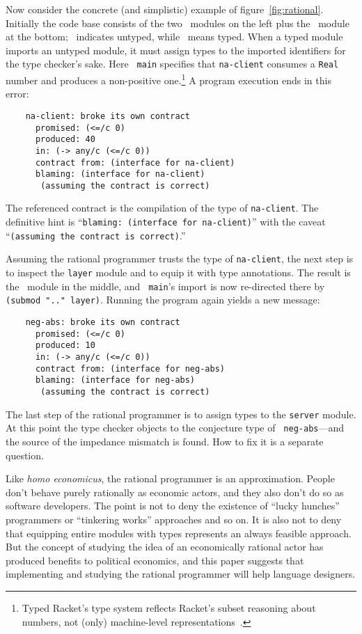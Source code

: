 Now consider the concrete (and simplistic) example of figure~\ref{fig:rational}.
Initially the code base consists of the two \dyncolor\ modules on the left plus
the \typecolor\ module at the bottom; \dyncolor\ indicates untyped, while
\typecolor\ means typed. When a typed module imports an untyped module, it must
assign types to the imported identifiers for the type checker's sake. Here {\tt
main} specifies that {\tt na-client} consumes a {\tt Real} number and produces a
non-positive one.\footnote{Typed Racket's type system reflects Racket's subset
reasoning about numbers, not (only) machine-level
representations~\cite{stathff-padl-12}.} A program execution ends in this error:
\begin{verbatim}
    na-client: broke its own contract
      promised: (<=/c 0)
      produced: 40
      in: (-> any/c (<=/c 0))           
      contract from: (interface for na-client)
      blaming: (interface for na-client)
       (assuming the contract is correct)
\end{verbatim}
The referenced contract is the compilation of the type of {\tt na-client}. The
definitive hint is ``{\tt blaming: (interface for na-client)}'' with the caveat
``{\tt (assuming the contract is correct)}.''

Assuming the rational programmer trusts the type of {\tt na-client}, the next
step is to inspect the {\tt layer} module and to equip it with type
annotations. The result is the \typecolor\ module in the middle, and {\tt
main}'s import is now re-directed there by {\tt (submod ".." layer)}. Running the
program again yields a new message:
\begin{verbatim}
    neg-abs: broke its own contract
      promised: (<=/c 0)
      produced: 10
      in: (-> any/c (<=/c 0))
      contract from: (interface for neg-abs)
      blaming: (interface for neg-abs)
       (assuming the contract is correct)
\end{verbatim}
The last step of the rational programmer is to assign types to the {\tt server}
module. At this point the type checker objects to the conjecture type of {\tt
neg-abs}---and the source of the impedance mismatch is found. How to fix it is a
separate question.

Like {\it homo economicus\/}, the rational programmer is an
approximation.  People don't behave purely rationally as economic
actors, and they also don't do so as software developers. The point is
not to deny the existence of ``lucky hunches'' programmers or
``tinkering works'' approaches and so on. It is also not to deny that
equipping entire modules with types represents an always feasible
approach.  But the concept of studying the idea of an economically
rational actor has produced benefits to political economics, and this
paper suggests that implementing and studying the rational programmer
will help language designers.
